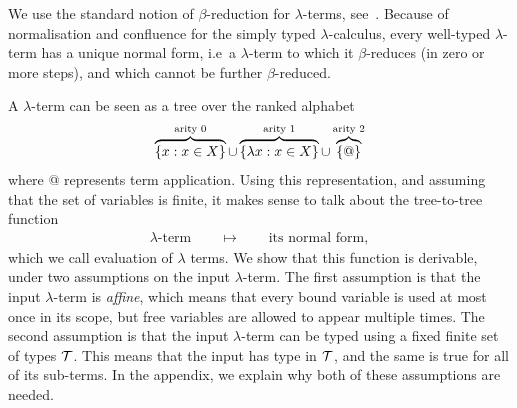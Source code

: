 We use the standard notion of $\beta$-reduction for $\lambda$-terms, see~\cite[Definition 1.2.1]{sorensen_lectures_2006}.  
Because of normalisation and confluence for the simply typed $\lambda$-calculus, every well-typed $\lambda$-term has a unique normal form, i.e~a $\lambda$-term to which it $\beta$-reduces (in zero or more steps), and which cannot be further $\beta$-reduced.

A $\lambda$-term  can be seen as a tree over the ranked alphabet
\begin{align}
    \label{eq:alphabet-for-lambda-terms}
  \overbrace{\{x : x \in X\}}^{\text{arity 0}} \cup \overbrace{\{\lambda x : x \in X\}}^{\text{arity 1}} \cup  \overbrace{\{@\}}^{\text{arity 2}}
\end{align}
where @ represents term application. Using this representation, and assuming that the set of variables is finite, it makes sense to talk about the tree-to-tree function
\begin{align*}
\text{$\lambda$-term} \qquad \mapsto \qquad \text{its normal form},
\end{align*}
which we call evaluation of $\lambda$ terms. We show that this function is derivable, under two assumptions on the input $\lambda$-term.  The first assumption is that the input $\lambda$-term is \emph{affine}, which means that 
    every bound variable is used at most once in its scope, but free variables are allowed to appear multiple times.  
     The second assumption is that  the input $\lambda$-term can be typed using a fixed finite set of types ${\mathcal T}$. This means that the input has type in ${\mathcal T}$, and the same is true for all of its  sub-terms.  In the appendix, we explain why both of these assumptions are needed.



